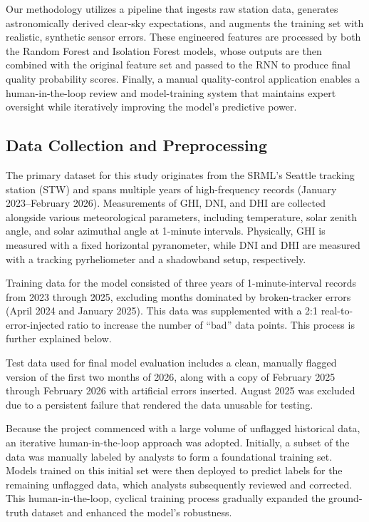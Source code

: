 \documentclass[12pt]{article}
\begin{document}
Our methodology utilizes a pipeline that ingests raw station data, generates astronomically derived clear-sky expectations, and augments the training set with realistic, synthetic sensor errors. These engineered features are processed by both the Random Forest and Isolation Forest models, whose outputs are then combined with the original feature set and passed to the RNN to produce final quality probability scores. Finally, a manual quality-control application enables a human-in-the-loop review and model-training system that maintains expert oversight while iteratively improving the model's predictive power.

\subsection*{Data Collection and Preprocessing}
The primary dataset for this study originates from the SRML's Seattle tracking station (STW) and spans multiple years of high-frequency records (January 2023--February 2026). Measurements of GHI, DNI, and DHI are collected alongside various meteorological parameters, including temperature, solar zenith angle, and solar azimuthal angle at 1-minute intervals. Physically, GHI is measured with a fixed horizontal pyranometer, while DNI and DHI are measured with a tracking pyrheliometer and a shadowband setup, respectively. 

Training data for the model consisted of three years of 1-minute-interval records from 2023 through 2025, excluding months dominated by broken-tracker errors (April 2024 and January 2025). This data was supplemented with a 2:1 real-to-error-injected ratio to increase the number of ``bad'' data points. This process is further explained below.

Test data used for final model evaluation includes a clean, manually flagged version of the first two months of 2026, along with a copy of February 2025 through February 2026 with artificial errors inserted. August 2025 was excluded due to a persistent failure that rendered the data unusable for testing.

Because the project commenced with a large volume of unflagged historical data, an iterative human-in-the-loop approach was adopted. Initially, a subset of the data was manually labeled by analysts to form a foundational training set. Models trained on this initial set were then deployed to predict labels for the remaining unflagged data, which analysts subsequently reviewed and corrected. This human-in-the-loop, cyclical training process gradually expanded the ground-truth dataset and enhanced the model's robustness.
\end{document}
